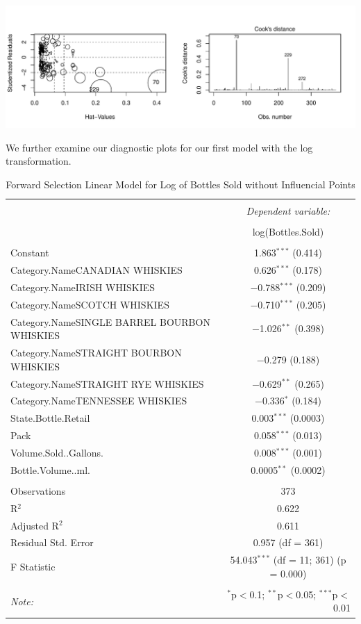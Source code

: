 \documentclass[]{elsarticle} %
\makeatletter
\def\maxwidth{\ifdim\Gin@nat@width>\linewidth\linewidth
\else\Gin@nat@width\fi}
\let\Oldincludegraphics\includegraphics
\renewcommand{\includegraphics}[1]{\Oldincludegraphics[width=\maxwidth]{#1}}
\makeatother
\begin{document}
\includegraphics{Final_Project_files/figure-latex/unnamed-chunk-14-1.pdf}

\newpage

We further examine our diagnostic plots for our first model with the log
transformation.

\begin{table}[!htbp] \centering 
  \caption{Forward Selection Linear Model for Log of Bottles Sold without Influencial Points} 
  \label{} 
\normalsize 
\begin{tabular}{@{\extracolsep{5pt}}lc} 
\\[-1.8ex]\hline 
\hline \\[-1.8ex] 
 & \multicolumn{1}{c}{\textit{Dependent variable:}} \\ 
\cline{2-2} 
\\[-1.8ex] & log(Bottles.Sold) \\ 
\hline \\[-1.8ex] 
 Constant & 1.863$^{***}$ (0.414) \\ 
  Category.NameCANADIAN WHISKIES & 0.626$^{***}$ (0.178) \\ 
  Category.NameIRISH WHISKIES & $-$0.788$^{***}$ (0.209) \\ 
  Category.NameSCOTCH WHISKIES & $-$0.710$^{***}$ (0.205) \\ 
  Category.NameSINGLE BARREL BOURBON WHISKIES & $-$1.026$^{**}$ (0.398) \\ 
  Category.NameSTRAIGHT BOURBON WHISKIES & $-$0.279 (0.188) \\ 
  Category.NameSTRAIGHT RYE WHISKIES & $-$0.629$^{**}$ (0.265) \\ 
  Category.NameTENNESSEE WHISKIES & $-$0.336$^{*}$ (0.184) \\ 
  State.Bottle.Retail & 0.003$^{***}$ (0.0003) \\ 
  Pack & 0.058$^{***}$ (0.013) \\ 
  Volume.Sold..Gallons. & 0.008$^{***}$ (0.001) \\ 
  Bottle.Volume..ml. & 0.0005$^{**}$ (0.0002) \\ 
 \hline \\[-1.8ex] 
Observations & 373 \\ 
R$^{2}$ & 0.622 \\ 
Adjusted R$^{2}$ & 0.611 \\ 
Residual Std. Error & 0.957 (df = 361) \\ 
F Statistic & 54.043$^{***}$ (df = 11; 361)  (p = 0.000) \\ 
\hline 
\hline \\[-1.8ex] 
\textit{Note:}  & \multicolumn{1}{r}{$^{*}$p$<$0.1; $^{**}$p$<$0.05; $^{***}$p$<$0.01} \\ 
\end{tabular} 
\end{table}
\end{document}
